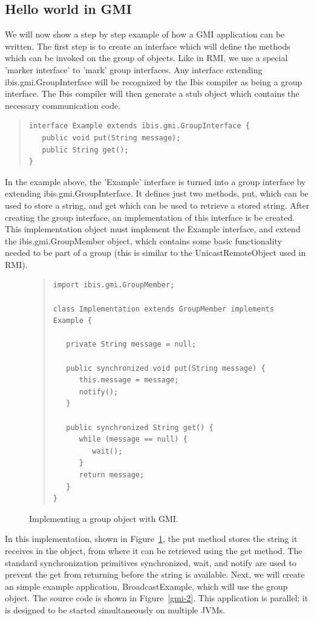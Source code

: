 \documentclass[10pt]{article}
\newcommand{\mysubsection}[1]{\subsection{#1}\label{#1}}
\begin{document}
\mysubsection{Hello world in GMI}

We will now show a
step by step example of how a GMI application can be written. The
first step is to create an interface which will define the methods
which can be invoked on the group of objects. Like in RMI, we use a
special 'marker interface' to 'mark' group interfaces. Any interface
extending ibis.gmi.GroupInterface will be recognized by the Ibis
compiler as being a group interface. The Ibis compiler will then
generate a stub object which contains the necessary communication
code.

\begin{quote}
\begin{verbatim}
interface Example extends ibis.gmi.GroupInterface {
   public void put(String message);
   public String get();
}
\end{verbatim}
\end{quote}
\noindent

In the example above, the 'Example' interface is turned into a group
interface by extending ibis.gmi.GroupInterface. It defines just two
methods, put, which can be used to store a string, and get which can
be used to retrieve a stored string.  After creating the group
interface, an implementation of this interface is be created. This
implementation object must implement the Example interface, and extend
the ibis.gmi.GroupMember object, which contains some basic
functionality needed to be part of a group (this is similar to the
UnicastRemoteObject used in RMI).

\begin{figure}[t!]
\small{
\begin{quote}
\begin{verbatim}
import ibis.gmi.GroupMember;

class Implementation extends GroupMember implements Example {

   private String message = null;

   public synchronized void put(String message) {
      this.message = message;
      notify();
   }
   
   public synchronized String get() { 
      while (message == null) { 
         wait();
      }       
      return message;
   } 
}
\end{verbatim}
\end{quote}
}
\caption{Implementing a group object with GMI.}
\label{gmi-1}
\end{figure}

In this implementation, shown in Figure~\ref{gmi-1}, the put method stores the
string it receives in the object, from where it can be retrieved using
the get method. The standard synchronization primitives synchronized,
wait, and notify are used to prevent the get from returning before the
string is available.  Next, we will create an simple example
application, BroadcastExample, which will use the group object. The
source code is shown in Figure~\ref{gmi-2}. This application is parallel; it is
designed to be started simultaneously on multiple JVMs.
\end{document}
